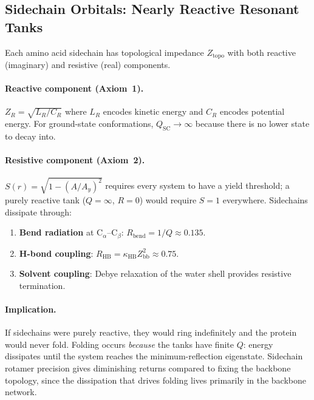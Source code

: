 \subsection{Sidechain Orbitals: Nearly Reactive Resonant Tanks}
\label{sec:reactive_tanks}

Each amino acid sidechain has topological impedance $Z_\text{topo}$
with both reactive (imaginary) and resistive (real) components.

\paragraph{Reactive component (Axiom~1).}
$Z_R = \sqrt{L_R/C_R}$ where $L_R$ encodes kinetic energy and
$C_R$ encodes potential energy.  For ground-state conformations,
$Q_\text{SC} \to \infty$ because there is no lower state to decay
into.

\paragraph{Resistive component (Axiom~2).}
$S(r) = \sqrt{1 - (A/A_y)^2}$ requires every system to have a
yield threshold; a purely reactive tank ($Q = \infty$, $R = 0$)
would require $S = 1$ everywhere.  Sidechains dissipate through:
\begin{enumerate}
    \item \textbf{Bend radiation} at C$_\alpha$--C$_\beta$:
          $R_\text{bend} = 1/Q \approx 0.135$.
    \item \textbf{H-bond coupling}:
          $R_\text{HB} = \kappa_\text{HB} Z_\text{bb}^2 \approx 0.75$.
    \item \textbf{Solvent coupling}: Debye relaxation of the water
          shell provides resistive termination.
\end{enumerate}

\paragraph{Implication.}
If sidechains were purely reactive, they would ring indefinitely
and the protein would never fold.  Folding occurs \emph{because}
the tanks have finite $Q$: energy dissipates until the system
reaches the minimum-reflection eigenstate.  Sidechain rotamer
precision gives diminishing returns compared to fixing the backbone
topology, since the dissipation that drives folding lives primarily
in the backbone network.


